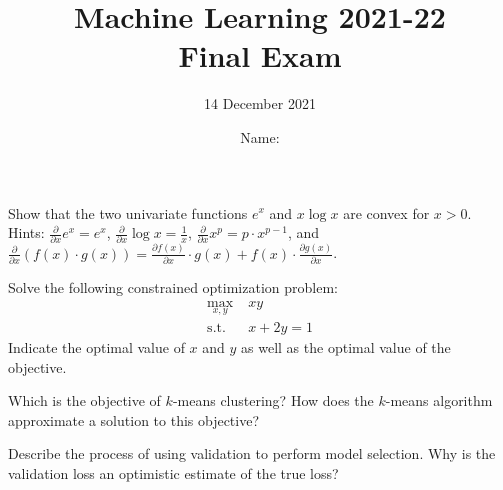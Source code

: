 \documentclass[11pt]{article}
\title{
\vspace{-1.2cm}
Machine Learning 2021-22\\ Final Exam}
\author{14 December 2021}
\date{Name: \dotfill}%
\newcounter{marks}
\begin{document}
\maketitle


\begin{list}{{\bf Question :}}
	{
	}

\item
{}
\addtocounter{marks}{1}
Show that the two univariate functions $e^x$ and $x\log x$ are convex for $x>0$.\\
Hints: $\frac \partial {\partial x} e^x = e^x$, $\frac \partial {\partial x} \log x = \frac 1 x$, $\frac \partial {\partial x} x^p = p \cdot x^{p-1}$, and $\frac \partial {\partial x} \left( f(x) \cdot g(x) \right) = \frac {\partial f(x)} {\partial x} \cdot g(x) + f(x) \cdot\frac {\partial g(x)} {\partial x}$.

\framebox[16cm][l]{ 
\parbox{15.9cm}{
\vspace*{7cm}
}}

\item
{}
\addtocounter{marks}{2}
Solve the following constrained optimization problem:
  \begin{align*}
	\max_{x,y} \; & xy\\
	\mathrm{s.t.} \; & x + 2y = 1
  \end{align*}
  Indicate the optimal value of $x$ and $y$ as well as the optimal value of the objective.

\framebox[16cm][l]{ 
\parbox{15.9cm}{
\vspace*{7cm}
}}

\pagebreak



\item
{}
\addtocounter{marks}{1}
Which is the objective of $k$-means clustering? How does the $k$-means algorithm approximate a solution to this objective?

\framebox[16cm][l]{ 
\parbox{15.9cm}{
\vspace*{6.2cm}
}}


\item
{}
\addtocounter{marks}{1}
Describe the process of using validation to perform model selection. Why is the validation loss an optimistic estimate of the true loss?

\framebox[16cm][l]{ 
\parbox{15.9cm}{
\vspace*{6.2cm}
}}


\end{list}
\end{document}
